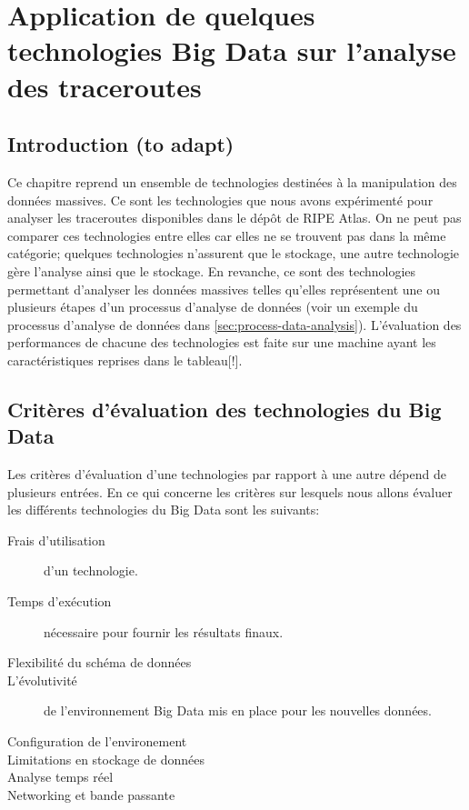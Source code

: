 \chapter{Application de quelques technologies Big Data sur l'analyse des traceroutes} \label{chap:application-on-traceroutes}


\section{Introduction (to adapt)}

Ce chapitre reprend un ensemble de   technologies destinées  à la manipulation des données massives. Ce sont les technologies que nous avons expérimenté pour analyser les traceroutes disponibles dans le dépôt de RIPE Atlas.
On ne peut pas comparer ces technologies entre elles car elles ne se trouvent pas dans la même catégorie; quelques technologies n'assurent que le stockage, une autre technologie gère l'analyse ainsi que le stockage.  En revanche, ce sont des technologies permettant d'analyser les données massives telles qu'elles représentent une ou plusieurs étapes d'un processus d'analyse de données (voir un exemple du processus d'analyse de données dans \ref{sec:process-data-analysis}). L'évaluation des performances de chacune des technologies est faite sur une machine ayant les caractéristiques reprises dans le tableau[!].

\section{Critères d'évaluation des technologies du Big Data}

Les critères d'évaluation d'une technologies par rapport à une autre dépend de plusieurs entrées. En ce qui concerne les critères sur lesquels nous allons évaluer les différents technologies du Big Data sont les suivants:
\begin{description}
\item[Frais d'utilisation] d'un technologie.
\item[Temps d'exécution] nécessaire pour fournir les résultats finaux.
\item[Flexibilité du schéma de  données]
\item[L'évolutivité] de l'environnement Big Data mis en place pour les nouvelles données.
\item [Configuration de l'environement]
\item [Limitations en stockage de données]
\item[Analyse temps réel ]
\item [Networking et bande passante]
\end{description}


